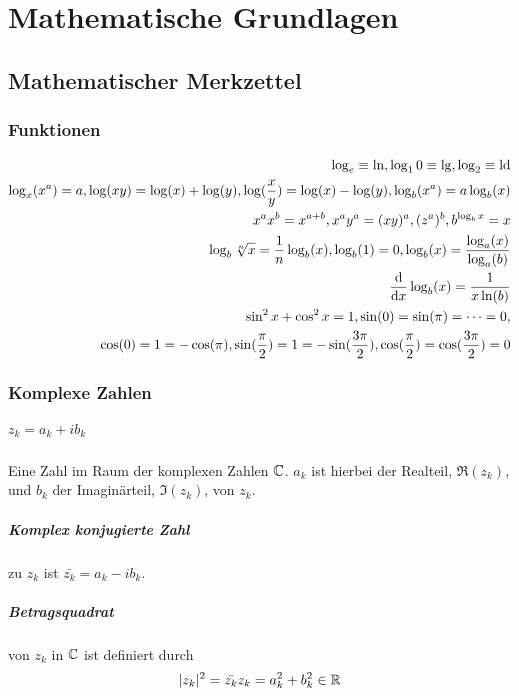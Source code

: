 \chapter{Mathematische Grundlagen}

\section{Mathematischer Merkzettel}

\subsection{Funktionen}
\begin{eqnarray*}
\log_e \equiv \ln, \log_10 \equiv \lg, \log_2 \equiv \mathrm{ld}\\
\log_x(x^a) = a, \log(xy) = \log(x) + \log(y), \log(\frac{x}{y}) = \log(x) - \log(y), \log_b(x^a) = a \log_b(x)\\
x^a x^b = x^{a + b}, x^a y^a = (x y)^a, (z^a)^b, b^{\log_b x} = x\\
\log_b \sqrt[n]{x} = \frac{1}{n} \log_b(x), \log_b(1) = 0, \log_b(x) = \frac{\log_a(x)}{\log_a(b)}\\
\frac{\mathrm d}{\mathrm d x} \log_b (x) = \frac{1}{x \ln(b)}\\
\sin^2x + \cos^2 x = 1, \sin(0) = \sin(\pi) = \dots = 0, \\ \cos(0) = 1 = - \cos(\pi), \sin(\frac{\pi}{2}) = 1 = - \sin(\frac{3 \pi}{2}), \cos(\frac{\pi}{2}) = \cos(\frac{3 \pi}{2}) = 0
\end{eqnarray*}

\subsection{Komplexe Zahlen}

\paragraph{$z_k = a_k + i b_k$} Eine Zahl im Raum der komplexen Zahlen $\mathbb C$. $a_k$ ist hierbei der Realteil, $\Re(z_k)$, und $b_k$ der Imaginärteil, $\Im(z_k)$, von $z_k$.
\paragraph{Komplex konjugierte Zahl} zu $z_k$ ist $\bar{z_k} = a_k - i b_k$.
\paragraph{Betragsquadrat} von $z_k$ in $\mathbb C$ ist definiert durch $$|z_k|^2 = \bar{z_k} z_k = a_k^2 + b_k^2 \in \mathbb R$$
